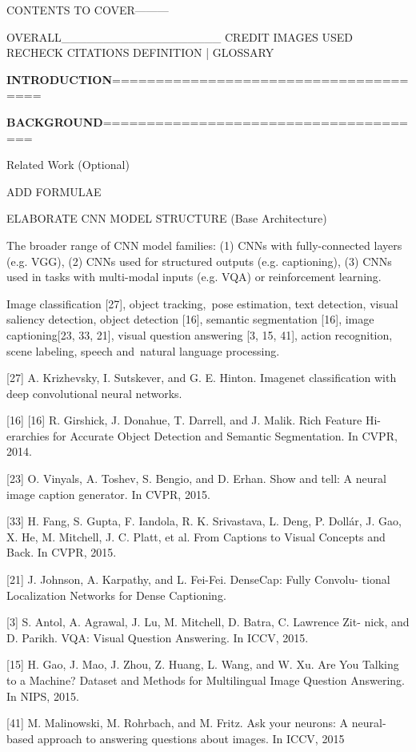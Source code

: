 CONTENTS TO COVER---------

OVERALL___________________
CREDIT IMAGES USED
RECHECK CITATIONS
DEFINITION | GLOSSARY


\textbf{INTRODUCTION}======================================

\textbf{BACKGROUND}======================================

Related Work (Optional)

ADD FORMULAE

ELABORATE CNN MODEL STRUCTURE (Base Architecture)

The broader range of CNN model families: (1) CNNs with fully-connected layers (e.g. VGG), (2) CNNs used for structured outputs (e.g. captioning), (3) CNNs used in tasks with multi-modal inputs (e.g. VQA) or reinforcement learning.


Image classification [27], object tracking, pose estimation, text detection, visual saliency detection, object detection [16], semantic segmentation [16], image captioning[23, 33, 21], visual question answering [3, 15, 41], action recognition, scene labeling, speech and natural language processing.

[27] A. Krizhevsky, I. Sutskever, and G. E. Hinton. Imagenet classification with deep convolutional neural networks.

[16] [16] R. Girshick, J. Donahue, T. Darrell, and J. Malik. Rich Feature Hi- erarchies for Accurate Object Detection and Semantic Segmentation. In CVPR, 2014.

[23] O. Vinyals, A. Toshev, S. Bengio, and D. Erhan. Show and tell: A neural image caption generator. In CVPR, 2015.

[33] H. Fang, S. Gupta, F. Iandola, R. K. Srivastava, L. Deng, P. Dollár, J. Gao, X. He, M. Mitchell, J. C. Platt, et al. From Captions to Visual Concepts and Back. In CVPR, 2015.

[21] J. Johnson, A. Karpathy, and L. Fei-Fei. DenseCap: Fully Convolu- tional Localization Networks for Dense Captioning. 

[3] S. Antol, A. Agrawal, J. Lu, M. Mitchell, D. Batra, C. Lawrence Zit- nick, and D. Parikh. VQA: Visual Question Answering. In ICCV, 2015.

[15] H. Gao, J. Mao, J. Zhou, Z. Huang, L. Wang, and W. Xu. Are You Talking to a Machine? Dataset and Methods for Multilingual Image Question Answering. In NIPS, 2015.

[41] M. Malinowski, M. Rohrbach, and M. Fritz. Ask your neurons: A neural-based approach to answering questions about images. In ICCV, 2015

